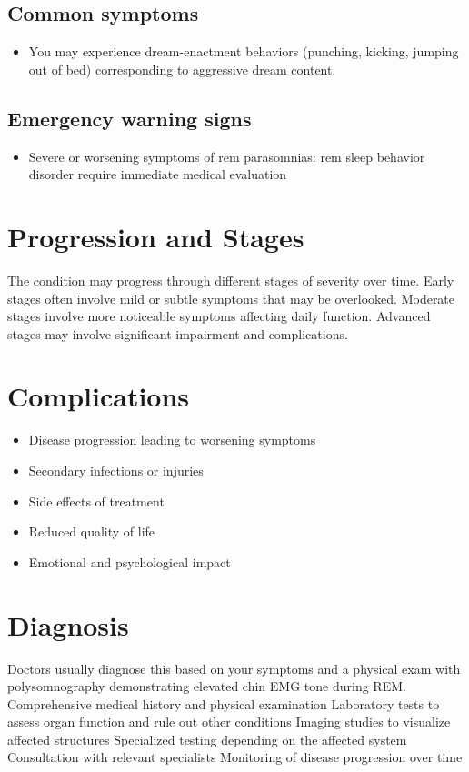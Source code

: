 \subsection{Common symptoms}
\begin{itemize}[noitemsep]
  \item You may experience dream-enactment behaviors (punching, kicking, jumping out of bed) corresponding to aggressive dream content. 
  \end{itemize}

\subsection{Emergency warning signs}
\begin{itemize}[noitemsep]
  \item Severe or worsening symptoms of rem parasomnias: rem sleep behavior disorder require immediate medical evaluation
\end{itemize}
\section{Progression and Stages}
The condition may progress through different stages of severity over time. Early stages often involve mild or subtle symptoms that may be overlooked. Moderate stages involve more noticeable symptoms affecting daily function. Advanced stages may involve significant impairment and complications.
\section{Complications}
\begin{itemize}[noitemsep]
  \item Disease progression leading to worsening symptoms
  \item Secondary infections or injuries
  \item Side effects of treatment
  \item Reduced quality of life
  \item Emotional and psychological impact
\end{itemize}
\section{Diagnosis}
Doctors usually diagnose this based on your symptoms and a physical exam with polysomnography demonstrating elevated chin EMG tone during REM. Comprehensive medical history and physical examination Laboratory tests to assess organ function and rule out other conditions Imaging studies to visualize affected structures Specialized testing depending on the affected system Consultation with relevant specialists Monitoring of disease progression over time

